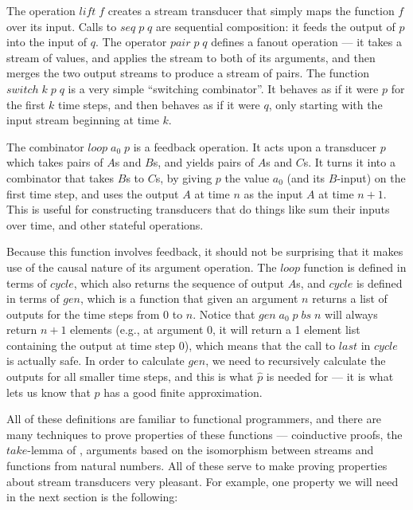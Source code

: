 The operation $\mathit{lift}\;f$ creates a stream transducer that simply maps
the function $f$ over its input. Calls to $\mathit{seq}\;p\;q$ are sequential
composition: it feeds the output of $p$ into the input of $q$. The
operator $\mathit{pair}\;p\;q$ defines a fanout operation --- it takes a stream
of values, and applies the stream to both of its arguments, and then
merges the two output streams to produce a stream of pairs. The
function $\mathit{switch}\;k\;p\;q$ is a very simple ``switching combinator''.
It behaves as if it were $p$ for the first $k$ time steps, and then
behaves as if it were $q$, only starting with the input stream
beginning at time $k$.

The combinator $\mathit{loop}\;a_0\;p$ is a feedback operation. It acts
upon a transducer $p$ which takes pairs of $A$s and $B$s, and yields
pairs of $A$s and $C$s. It turns it into a combinator that takes $B$s
to $C$s, by giving $p$ the value $a_0$ (and its $B$-input) on the
first time step, and uses the output $A$ at time $n$ as the input $A$
at time $n+1$. This is useful for constructing transducers that do
things like sum their inputs over time, and other stateful operations. 

Because this function involves feedback, it should not be surprising
that it makes use of the causal nature of its argument operation. The
$\mathit{loop}$ function is defined in terms of $\mathit{cycle}$, which also returns the
sequence of output $A$s, and $\mathit{cycle}$ is defined in terms of $\mathit{gen}$,
which is a function that given an argument $n$ returns a list of
outputs for the time steps from $0$ to $n$. Notice that
$\mathit{gen}\;a_0\;p\;bs\;n$ will always return $n+1$ elements (e.g., at
argument 0, it will return a 1 element list containing the output at
time step 0), which means that the call to $\mathit{last}$ in $\mathit{cycle}$ is
actually safe. In order to calculate $\mathit{gen}$, we need to recursively
calculate the outputs for all smaller time steps, and this is what
$\hat{p}$ is needed for --- it is what lets us know that $p$ has a good
finite approximation.

All of these definitions are familiar to functional programmers, and
there are many techniques to prove properties of these functions ---
coinductive proofs, the $\mathit{take}$-lemma of \citet{bird-wadler}, arguments based on
the isomorphism between streams and functions from natural
numbers. All of these serve to make proving properties about stream
transducers very pleasant. For example, one property we will need in
the next section is the following:

